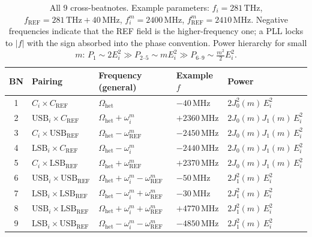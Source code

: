 \documentclass[11pt]{article}
\begin{document}
\begin{table}[h]
\centering
\renewcommand{\arraystretch}{1.4}
\begin{tabular}{cllll}
\toprule
BN & Pairing & Frequency (general) & Example $f$ & Power \\
\midrule
1 & $C_{i} \times C_{\text{REF}}$
  & $\Omega_{\text{het}}$
  & $-40\,\text{MHz}$
  & $2J_0^2(m)\,E_i^2$ \\
\color{gray}2 & \color{gray}$\mathrm{USB}_{i} \times C_{\text{REF}}$
  & \color{gray}$\Omega_{\text{het}} + \omega_{i}^{m}$
  & \color{gray}$+2360\,\text{MHz}$
  & \color{gray}$2J_0(m)J_1(m)\,E_i^2$ \\
\color{gray}3 & \color{gray}$C_{i} \times \mathrm{USB}_{\text{REF}}$
  & \color{gray}$\Omega_{\text{het}} - \omega_{\text{REF}}^{m}$
  & \color{gray}$-2450\,\text{MHz}$
  & \color{gray}$2J_0(m)J_1(m)\,E_i^2$ \\
\color{gray}4 & \color{gray}$\mathrm{LSB}_{i} \times C_{\text{REF}}$
  & \color{gray}$\Omega_{\text{het}} - \omega_{i}^{m}$
  & \color{gray}$-2440\,\text{MHz}$
  & \color{gray}$2J_0(m)J_1(m)\,E_i^2$ \\
\color{gray}5 & \color{gray}$C_{i} \times \mathrm{LSB}_{\text{REF}}$
  & \color{gray}$\Omega_{\text{het}} + \omega_{\text{REF}}^{m}$
  & \color{gray}$+2370\,\text{MHz}$
  & \color{gray}$2J_0(m)J_1(m)\,E_i^2$ \\
6 & $\mathrm{USB}_{i} \times \mathrm{USB}_{\text{REF}}$
  & $\Omega_{\text{het}} + \omega_{i}^{m} - \omega_{\text{REF}}^{m}$
  & $-50\,\text{MHz}$
  & $2J_1^2(m)\,E_i^2$ \\
7 & $\mathrm{LSB}_{i} \times \mathrm{LSB}_{\text{REF}}$
  & $\Omega_{\text{het}} - \omega_{i}^{m} + \omega_{\text{REF}}^{m}$
  & $-30\,\text{MHz}$
  & $2J_1^2(m)\,E_i^2$ \\
\color{gray}8 & \color{gray}$\mathrm{USB}_{i} \times \mathrm{LSB}_{\text{REF}}$
  & \color{gray}$\Omega_{\text{het}} + \omega_{i}^{m} + \omega_{\text{REF}}^{m}$
  & \color{gray}$+4770\,\text{MHz}$
  & \color{gray}$2J_1^2(m)\,E_i^2$ \\
\color{gray}9 & \color{gray}$\mathrm{LSB}_{i} \times \mathrm{USB}_{\text{REF}}$
  & \color{gray}$\Omega_{\text{het}} - \omega_{i}^{m} - \omega_{\text{REF}}^{m}$
  & \color{gray}$-4850\,\text{MHz}$
  & \color{gray}$2J_1^2(m)\,E_i^2$ \\
\bottomrule
\end{tabular}
\caption{All 9 cross-beatnotes.
         Example parameters: $f_{i} = 281\,\text{THz}$,
         $f_{\text{REF}} = 281\,\text{THz} + 40\,\text{MHz}$,
         $f_{i}^{m} = 2400\,\text{MHz}$,
         $f_{\text{REF}}^{m} = 2410\,\text{MHz}$.
         Negative frequencies indicate that the REF field is the higher-frequency one;
         a PLL locks to $|f|$ with the sign absorbed into the phase convention.
         Power hierarchy for small $m$:
         $P_{1} \sim 2E_i^2 \gg P_{2\text{--}5} \sim mE_i^2
          \gg P_{6\text{--}9} \sim \tfrac{m^2}{2}E_i^2$.}
\end{table}
\end{document}
